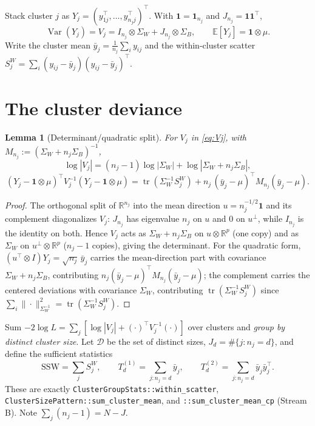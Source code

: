\documentclass[11pt]{article}
\newcommand{\E}{\mathbb{E}}
\newcommand{\tr}{\operatorname{tr}}
\newcommand{\Var}{\operatorname{Var}}
\newcommand{\Sw}{\Sigma_W}
\newcommand{\Sb}{\Sigma_B}
\newcommand{\SSW}{\mathrm{SSW}}
\theoremstyle{plain}
\newtheorem{lemma}{Lemma}
\theoremstyle{remark}
\begin{document}
Stack cluster $j$ as $Y_j=(y_{1j}^\top,\dots,y_{n_j j}^\top)^\top$. With
$\mathbf 1=\mathbf 1_{n_j}$ and $J_{n_j}=\mathbf 1\mathbf 1^\top$,
\begin{equation}
\label{eq:Vj}
\Var(Y_j)=V_j=I_{n_j}\otimes\Sw+J_{n_j}\otimes\Sb,\qquad
\E[Y_j]=\mathbf 1\otimes\mu .
\end{equation}
Write the cluster mean $\bar y_j=\tfrac1{n_j}\sum_i y_{ij}$ and the within-cluster
scatter $S_j^W=\sum_i (y_{ij}-\bar y_j)(y_{ij}-\bar y_j)^\top$.

\section{The cluster deviance}

\begin{lemma}[Determinant/quadratic split]
\label{lem:split}
For $V_j$ in \eqref{eq:Vj}, with $M_{n_j}:=(\Sw+n_j\Sb)^{-1}$,
\[
\log|V_j|=(n_j-1)\log|\Sw|+\log|\Sw+n_j\Sb|,
\]
\[
(Y_j-\mathbf 1\otimes\mu)^\top V_j^{-1}(Y_j-\mathbf 1\otimes\mu)
=\tr(\Sw^{-1}S_j^W)+n_j\,(\bar y_j-\mu)^\top M_{n_j}(\bar y_j-\mu).
\]
\end{lemma}

\begin{proof}
The orthogonal split of $\mathbb R^{n_j}$ into the mean direction
$u=n_j^{-1/2}\mathbf 1$ and its complement diagonalizes $V_j$: $J_{n_j}$ has
eigenvalue $n_j$ on $u$ and $0$ on $u^\perp$, while $I_{n_j}$ is the identity on
both. Hence $V_j$ acts as $\Sw+n_j\Sb$ on $u\otimes\mathbb R^p$ (one copy) and as
$\Sw$ on $u^\perp\otimes\mathbb R^p$ ($n_j-1$ copies), giving the determinant.
For the quadratic form, $(u^\top\otimes I)Y_j=\sqrt{n_j}\,\bar y_j$ carries the
mean-direction part with covariance $\Sw+n_j\Sb$, contributing
$n_j(\bar y_j-\mu)^\top M_{n_j}(\bar y_j-\mu)$; the complement carries the
centered deviations with covariance $\Sw$, contributing $\tr(\Sw^{-1}S_j^W)$
since $\sum_i\|\cdot\|^2_{\Sw^{-1}}=\tr(\Sw^{-1}S_j^W)$.
\end{proof}

Sum $-2\log L=\sum_j[\log|V_j|+(\cdot)^\top V_j^{-1}(\cdot)]$ over clusters and
\emph{group by distinct cluster size}. Let $\mathcal D$ be the set of distinct
sizes, $J_d=\#\{j:n_j=d\}$, and define the sufficient statistics
\begin{equation}
\label{eq:suffstats}
\SSW=\sum_j S_j^W,\qquad
T^{(1)}_d=\!\!\sum_{j:n_j=d}\!\!\bar y_j,\qquad
T^{(2)}_d=\!\!\sum_{j:n_j=d}\!\!\bar y_j\bar y_j^\top .
\end{equation}
These are exactly \texttt{ClusterGroupStats::within\_scatter},
\texttt{ClusterSizePattern::sum\_cluster\_mean}, and
\texttt{::sum\_cluster\_mean\_cp} (Stream B). Note $\sum_j(n_j-1)=N-J$.
\end{document}
